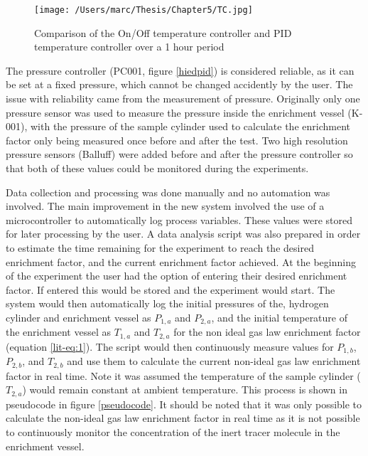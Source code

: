 \begin{figure}
    \centering
    \texttt{[image: /Users/marc/Thesis/Chapter5/TC.jpg]}
    \caption{Comparison of the On/Off temperature controller and PID temperature controller over a 1 hour period}
    \label{TCcompare}
\end{figure}

The pressure controller (PC001, figure \ref{hiedpid}) is considered reliable, as it can be set at a fixed pressure, which cannot be changed accidently by the user. The issue with reliability came from the measurement of pressure. Originally only one pressure sensor was used to measure the pressure inside the enrichment vessel (K-001), with the pressure of the sample cylinder used to calculate the enrichment factor only being measured once before and after the test. Two high resolution pressure sensors (Balluff) were added before and after the pressure controller so that both of these values could be monitored during the experiments. 

Data collection and processing was done manually and no automation was involved. The main improvement in the new system involved the use of a microcontroller to automatically log process variables. These values were stored for later processing by the user. A data analysis script was also prepared in order to estimate the time remaining for the experiment to reach the desired enrichment factor, and the current enrichment factor achieved. At the beginning of the experiment the user had the option of entering their desired enrichment factor. If entered this would be stored and the experiment would start. The system would then automatically log the initial pressures of the, hydrogen cylinder and enrichment vessel as $P_{1,a}$ and $P_{2,a}$, and the initial temperature of the enrichment vessel as $T_{1,a}$ and $T_{2,a}$ for the non ideal gas law enrichment factor (equation \ref{lit-eq:1}). The script would then continuously measure values for $P_{1,b}$, $P_{2,b}$, and $T_{2, b}$ and use them to calculate the current non-ideal gas law enrichment factor in real time. Note it was assumed the temperature of the sample cylinder ($T_{2,a}$) would remain constant at ambient temperature. This process is shown in pseudocode in figure \ref{pseudocode}. It should be noted that it was only possible to calculate the non-ideal gas law enrichment factor in real time as it is not possible to continuously monitor the concentration of the inert tracer molecule in the enrichment vessel. 

